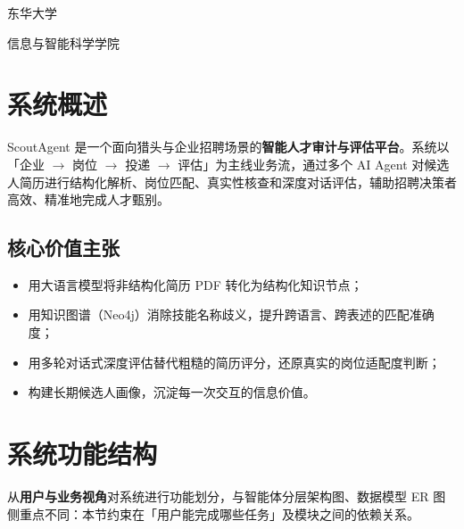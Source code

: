 \documentclass[12pt,a4paper]{ctexart}
\begin{document}
\vfill

\begin{center}

东华大学

信息与智能科学学院

\end{center}

\newpage

\setcounter{tocdepth}{2}
\tableofcontents
\newpage

\section{系统概述}

ScoutAgent 是一个面向猎头与企业招聘场景的\textbf{智能人才审计与评估平台}。系统以「企业 $\to$ 岗位 $\to$ 投递 $\to$ 评估」为主线业务流，通过多个 AI Agent 对候选人简历进行结构化解析、岗位匹配、真实性核查和深度对话评估，辅助招聘决策者高效、精准地完成人才甄别。

\subsection*{核心价值主张}

\begin{itemize}[itemsep=4pt]
  \item 用大语言模型将非结构化简历 PDF 转化为结构化知识节点；
  \item 用知识图谱（Neo4j）消除技能名称歧义，提升跨语言、跨表述的匹配准确度；
  \item 用多轮对话式深度评估替代粗糙的简历评分，还原真实的岗位适配度判断；
  \item 构建长期候选人画像，沉淀每一次交互的信息价值。
\end{itemize}

\section{系统功能结构}

从\textbf{用户与业务视角}对系统进行功能划分，与智能体分层架构图、数据模型 ER 图侧重点不同：本节约束在「用户能完成哪些任务」及模块之间的依赖关系。
\end{document}
